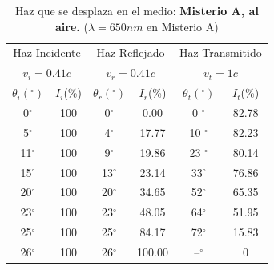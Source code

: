 \documentclass[
aps,
reprint,
amsmath, amssymb,
superscriptaddress,
]{revtex4-2}
\begin{document}
\begin{table}[H]%
    \caption{\label{tab:tabla2}Haz que se desplaza en el medio: \textbf{Misterio A, al aire.} ($\lambda=650nm$ en Misterio A)}
     \begin{ruledtabular}
     \begin{tabular}{cc|cc|cc}
        \multicolumn{2}{c}{Haz Incidente}  & \multicolumn{2}{c}{Haz Reflejado} & \multicolumn{2}{c}{Haz Transmitido} \\
        \multicolumn{2}{c}{$v_i = 0.41c$}  & \multicolumn{2}{c}{$v_r= 0.41c$} & \multicolumn{2}{c}{$v_t= 1c$} \\
        \hline
        $\theta_i (^{\circ})$   & $I_{i}$(\%) & $\theta_r(^{\circ})$ & $I_{r}$(\%) & $\theta_t(^{\circ})$ & $I_{t}$(\%)\\
         0$^{\circ}$ & 100 &  0$^{\circ}$ &  0.00 & 0 $^{\circ}$ &  82.78\\
         5$^{\circ}$ & 100 &  4$^{\circ}$ & 17.77 & 10 $^{\circ}$ & 82.23 \\
        11$^{\circ}$ & 100 &  9$^{\circ}$ & 19.86 & 23 $^{\circ}$ & 80.14 \\
        15$^{\circ}$ & 100 & 13$^{\circ}$ & 23.14 & 33$^{\circ}$ &  76.86\\
        20$^{\circ}$ & 100 & 20$^{\circ}$ & 34.65 & 52$^{\circ}$ &  65.35\\
        23$^{\circ}$ & 100 & 23$^{\circ}$ & 48.05 & 64$^{\circ}$ &  51.95 \\
        25$^{\circ}$ & 100 & 25$^{\circ}$ & 84.17 & 72$^{\circ}$ &  15.83 \\
        26$^{\circ}$ & 100 & 26$^{\circ}$ &100.00 & --$^{\circ}$ &  0
        \end{tabular}
     \end{ruledtabular}
\end{table}
\end{document}
